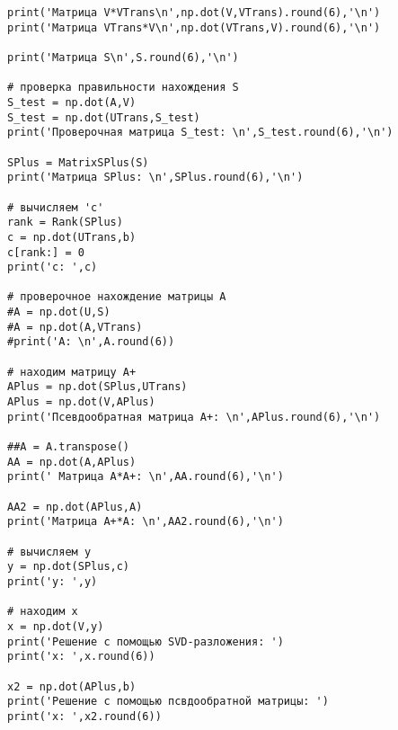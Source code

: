 \documentclass[13pt,a4paper]{scrartcl}
\begin{document}
\begin{verbatim}
print('Матрица V*VTrans\n',np.dot(V,VTrans).round(6),'\n')
print('Матрица VTrans*V\n',np.dot(VTrans,V).round(6),'\n')

print('Матрица S\n',S.round(6),'\n')

# проверка правильности нахождения S
S_test = np.dot(A,V)
S_test = np.dot(UTrans,S_test)
print('Проверочная матрица S_test: \n',S_test.round(6),'\n')

SPlus = MatrixSPlus(S)
print('Матрица SPlus: \n',SPlus.round(6),'\n')

# вычисляем 'c'
rank = Rank(SPlus)
c = np.dot(UTrans,b) 
c[rank:] = 0
print('c: ',c)

# проверочное нахождение матрицы A
#A = np.dot(U,S)
#A = np.dot(A,VTrans)
#print('A: \n',A.round(6))

# находим матрицу A+
APlus = np.dot(SPlus,UTrans)
APlus = np.dot(V,APlus)
print('Псевдообратная матрица A+: \n',APlus.round(6),'\n')

##A = A.transpose()
AA = np.dot(A,APlus)
print(' Матрица A*A+: \n',AA.round(6),'\n')

AA2 = np.dot(APlus,A)
print('Матрица A+*A: \n',AA2.round(6),'\n')

# вычисляем y
y = np.dot(SPlus,c)
print('y: ',y)

# находим x
x = np.dot(V,y)
print('Решение с помощью SVD-разложения: ')
print('x: ',x.round(6))

x2 = np.dot(APlus,b)
print('Решение с помощью псвдообратной матрицы: ')
print('x: ',x2.round(6))


\end{verbatim}
\end{document}
